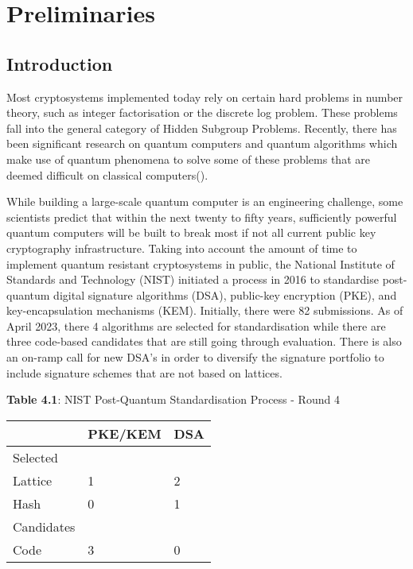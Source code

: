 \chapter{Preliminaries}


\section{Introduction}
Most cryptosystems implemented today rely on certain hard problems in number theory, such as integer factorisation or the discrete log problem. These problems fall into the general category of Hidden Subgroup Problems. Recently, there has been significant research on quantum computers and quantum algorithms which make use of quantum phenomena to solve some of these problems that are deemed difficult on classical computers(\cite{Shor,Jozsa}). 

While building a large-scale quantum computer is an engineering challenge, some scientists predict that within the next twenty to fifty years, sufficiently powerful quantum computers will be built to break most if not all current public key cryptography infrastructure. Taking into account the amount of time to implement quantum resistant cryptosystems in public, the National Institute of Standards and Technology (NIST) initiated a process in 2016 to standardise post-quantum digital signature algorithms (DSA), public-key encryption (PKE), and key-encapsulation mechanisms (KEM). Initially, there were 82 submissions. As of April 2023, there 4 algorithms are selected for standardisation while there are three code-based candidates that are still going through evaluation. There is also an on-ramp call for new DSA's in order to diversify the signature portfolio to include signature schemes that are not based on lattices.


\begin{center}
\textbf{Table 4.1}: NIST Post-Quantum Standardisation Process - Round 4
\end{center}
\begin{table}[h]
\centering
\begin{tabular}{lll}
\hline
 & PKE/KEM & DSA \\ \hline
Selected &  &  \\ \hline
Lattice & 1 & 2 \\
Hash & 0 & 1 \\ \hline
Candidates &  &  \\ \hline
Code & 3 & 0 \\ \hline
\end{tabular}

\end{table}

